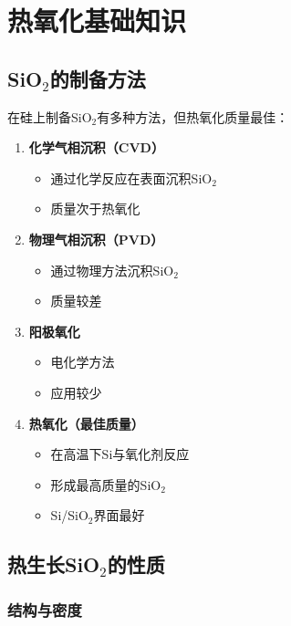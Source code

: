 \documentclass[UTF8,12pt,a4paper]{ctexart}
\begin{document}
\section{热氧化基础知识}

\subsection{SiO$_2$的制备方法}

在硅上制备SiO$_2$有多种方法，但热氧化质量最佳：

\begin{enumerate}
    \item \textbf{化学气相沉积（CVD）}
    \begin{itemize}
        \item 通过化学反应在表面沉积SiO$_2$
        \item 质量次于热氧化
    \end{itemize}
    
    \item \textbf{物理气相沉积（PVD）}
    \begin{itemize}
        \item 通过物理方法沉积SiO$_2$
        \item 质量较差
    \end{itemize}
    
    \item \textbf{阳极氧化}
    \begin{itemize}
        \item 电化学方法
        \item 应用较少
    \end{itemize}
    
    \item \textbf{热氧化（最佳质量）}
    \begin{itemize}
        \item 在高温下Si与氧化剂反应
        \item 形成最高质量的SiO$_2$
        \item Si/SiO$_2$界面最好
    \end{itemize}
\end{enumerate}

\subsection{热生长SiO$_2$的性质}

\subsubsection{结构与密度}
\end{document}

